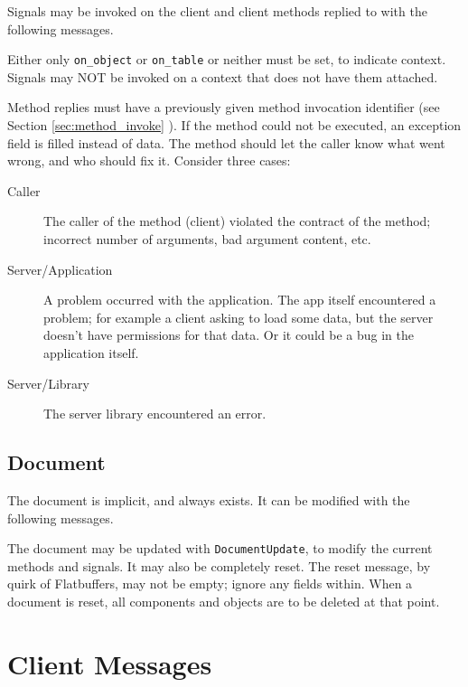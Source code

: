 \documentclass[11pt, oneside]{amsart}
\begin{document}
Signals may be invoked on the client and client methods replied to with the following messages.



Either only \texttt{on\_object} or \texttt{on\_table} or neither must be set, to indicate context. Signals may NOT be invoked on a context that does not have them attached.

Method replies must have a previously given method invocation identifier (see Section \ref{sec:method_invoke} ). If the method could not be executed, an exception field is filled instead of data. The method should let the caller know what went wrong, and who should fix it. Consider three cases:

\begin{description}
	\item[Caller] The caller of the method (client) violated the contract of the method; incorrect number of arguments, bad argument content, etc.
	\item[Server/Application] A problem occurred with the application. The app itself encountered a problem; for example a client asking to load some data, but the server doesn't have permissions for that data. Or it could be a bug in the application itself.
	\item[Server/Library] The server library encountered an error.
\end{description}

\subsection{Document}

The document is implicit, and always exists. It can be modified with the following messages.



The document may be updated with \texttt{DocumentUpdate}, to modify the current methods and signals. It may also be completely reset. The reset message, by quirk of Flatbuffers, may not be empty; ignore any fields within. When a document is reset, all components and objects are to be deleted at that point.

\section{Client Messages}
\end{document}

